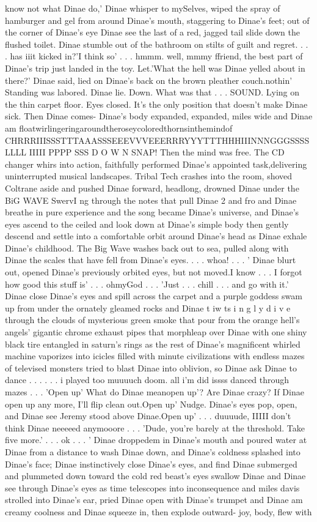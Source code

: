 \documentclass[12pt]{book}
\begin{document}
know not what Dinae do,' Dinae whisper to mySelves, wiped the spray of hamburger and gel from around Dinae's mouth, staggering to Dinae's feet; out of the corner of Dinae's eye Dinae see the last of a red, jagged tail slide down the flushed toilet. Dinae stumble out of the bathroom on stilts of guilt and regret. . . . has iiit kicked in?'I think so' . . . hmmm. well, mmmy ffriend, the best part of Dinae's trip just landed in the toy. Let.'What the hell was Dinae yelled about in there?' Dinae said, lied on Dinae's back on the brown pleather couch.nothin' Standing was labored. Dinae lie. Down. What was that . . .  SOUND. Lying on the thin carpet floor. Eyes closed. It's the only position that doesn't make Dinae sick. Then Dinae comes- Dinae's body expanded, expanded, miles wide and Dinae am floatwirlingeringaroundtheroseycoloredthornsinthemindof CHRRRIIISSSTTTAAASSSEEEVVVEEERRRYYYTTTHHHIIINNNGGGSSSS LLLL IIIII PPPP SSS D O W N SNAP! Then the mind was free. The CD changer whirs into action, faithfully performed Dinae's appointed task,delivering uninterrupted musical landscapes. Tribal Tech crashes into the room, shoved Coltrane aside and pushed Dinae forward, headlong, drowned Dinae under the BiG WAVE SwervI ng through the notes that pull Dinae 2 and fro and Dinae breathe in pure experience and the song became Dinae's universe, and Dinae's eyes ascend to the ceiled and look down at Dinae's simple body then gently descend and settle into a comfortable orbit around Dinae's head as Dinae exhale Dinae's childhood. The Big Wave washes back out to sea, pulled along with Dinae the scales that have fell from Dinae's eyes. . . . whoa! . . . ' Dinae blurt out, opened Dinae's previously orbited eyes, but not moved.I know . . . I forgot how good this stuff is' . . . ohmyGod . . . 'Just . . . chill . . . and go with it.' Dinae close Dinae's eyes and spill across the carpet and a purple goddess swam up from under the ornately gleamed rocks and Dinae t iw ts i n g l y d i v e through the clouds of mysterious green smoke that pour from the orange hell's angels' gigantic chrome exhaust pipes that morphleap over Dinae with one shiny black tire entangled in saturn's rings as the rest of Dinae's magnificent whirled machine vaporizes into icicles filled with minute civilizations with endless mazes of televised monsters tried to blast Dinae into oblivion, so Dinae ask Dinae to dance . . .  . . . i played too muuuuch doom. all i'm did issss danced through mazes . . . 'Open up' What do Dinae meanopen up'? Are Dinae crazy? If Dinae open up any more, I'll flip clean out.Open up' Nudge. Dinae's eyes pop, open, and Dinae see Jeremy stood above Dinae.Open up' . . . duuuude, IIIII don't think Dinae neeeeed anymooore . . . 'Dude, you're barely at the threshold. Take five more.' . . . ok . . . ' Dinae droppedem in Dinae's mouth and poured water at Dinae from a distance to wash Dinae down, and Dinae's coldness splashed into Dinae's face; Dinae instinctively close Dinae's eyes, and find Dinae submerged and plummeted down toward the cold red beast's eyes swallow Dinae and Dinae see through Dinae's eyes as time telescopes into inconsequence and miles davis strolled into Dinae's ear, pried Dinae open with Dinae's trumpet and Dinae am creamy coolness and Dinae squeeze in, then explode outward- joy, body, flew with 
\end{document}
